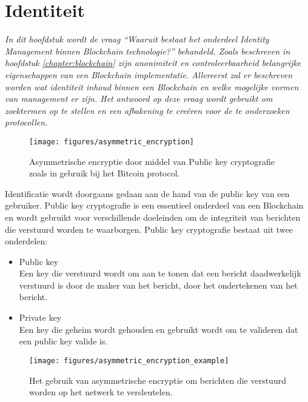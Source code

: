 \section{Identiteit}

\textit{
  In dit hoofdstuk wordt de vraag ``Waaruit bestaat het onderdeel Identity Management binnen Blockchain technologie?'' behandeld. Zoals beschreven in hoofdstuk \ref{chapter:blockchain} zijn anonimiteit en controleerbaarheid belangrijke eigenschappen van een Blockchain implementatie. Allereerst zal er beschreven worden wat identiteit inhoud binnen een Blockchain en welke mogelijke vormen van management er zijn. Het antwoord op deze vraag wordt gebruikt om zoektermen op te stellen en een afbakening te creëren voor de te onderzoeken protocollen.
}

\begin{wrapfigure}[12]{r}{0.5\textwidth}
  \texttt{[image: figures/asymmetric\_encryption]}
  \caption[Asymmetrische encryptie]{
    Asymmetrische encryptie door middel van Public key cryptografie zoals in gebruik bij het Bitcoin protocol.
  }
  \label{asymmetric_encryption}    
\end{wrapfigure}

Identificatie wordt doorgaans gedaan aan de hand van de public key van een gebruiker. Public key cryptografie is een essentieel onderdeel van een Blockchain en wordt gebruikt voor verschillende doeleinden om de integriteit van berichten die verstuurd worden te waarborgen. Public key cryptografie bestaat uit twee onderdelen:

\begin{itemize}
  \item Public key
  \\ Een key die verstuurd wordt om aan te tonen dat een bericht daadwerkelijk verstuurd is door de maker van het bericht, door het ondertekenen van het bericht.
  \item Private key
  \\ Een key die geheim wordt gehouden en gebruikt wordt om te valideren dat een public key valide is.
\end{itemize}

\begin{wrapfigure}[5]{l}{0.3\textwidth}
  \texttt{[image: figures/asymmetric\_encryption\_example]}
  \caption[Gebruik van asymmetrische encryptie]{
    Het gebruik van asymmetrische encryptie om berichten die verstuurd worden op het netwerk te versleutelen.
  }
  \label{asymmetric_encryption_example}    
\end{wrapfigure}

